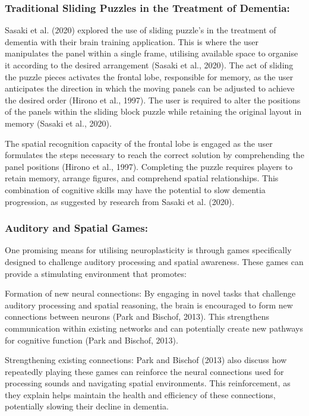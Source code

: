 \documentclass{l4proj}
\begin{document}
\subsubsection{Traditional Sliding Puzzles in the Treatment of Dementia:}\label{sec:sliding_dementia}

Sasaki et al. (2020) explored the use of sliding puzzle's in the treatment of dementia with their brain training application. This is where the user manipulates the panel within a single frame, utilising available space to organise it according to the desired arrangement (Sasaki et al., 2020). The act of sliding the puzzle pieces activates the frontal lobe, responsible for memory, as the user anticipates the direction in which the moving panels can be adjusted to achieve the desired order (Hirono et al., 1997). The user is required to alter the positions of the panels within the sliding block puzzle while retaining the original layout in memory (Sasaki et al., 2020).

The spatial recognition capacity of the frontal lobe is engaged as the user formulates the steps necessary to reach the correct solution by comprehending the panel positions (Hirono et al., 1997). Completing the puzzle requires players to retain memory, arrange figures, and comprehend spatial relationships. This combination of cognitive skills may have the potential to slow dementia progression, as suggested by research from Sasaki et al. (2020). \newline


\subsubsection{Auditory and Spatial Games:}
One promising means for utilising neuroplasticity is through games specifically designed to challenge auditory processing and spatial awareness. These games can provide a stimulating environment that promotes:

Formation of new neural connections: By engaging in novel tasks that challenge auditory processing and spatial reasoning, the brain is encouraged to form new connections between neurons (Park and Bischof, 2013). This strengthens communication within existing networks and can potentially create new pathways for cognitive function (Park and Bischof, 2013).

Strengthening existing connections: Park and Bischof (2013) also discuss how repeatedly playing these games can reinforce the neural connections used for processing sounds and navigating spatial environments. This reinforcement, as they explain helps maintain the health and efficiency of these connections, potentially slowing their decline in dementia.
\end{document}
